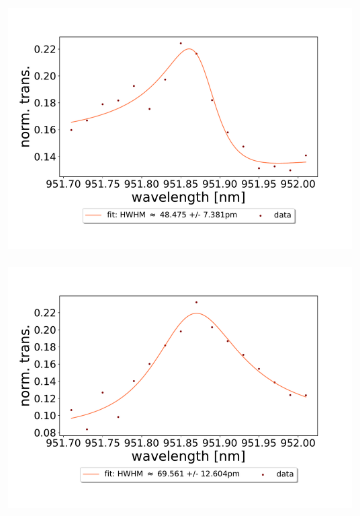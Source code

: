 \begin{figure}[h!]
\begin{subfigure}[b]{0.49\textwidth}
        \includegraphics[width=\textwidth]{figures/results/double fano fits/120um_M3:M5_fit_5.pdf}
        \caption{}
        \label{fig:120um_M3:M5_fit_5}
    \end{subfigure}
    \begin{subfigure}[b]{0.49\textwidth}
        \includegraphics[width=\textwidth]{figures/results/double fano fits/120um_M3:M5_fit_6.pdf}
        \caption{}
        \label{fig:120um_M3:M5_fit_6}
    \end{subfigure}
\end{figure}

